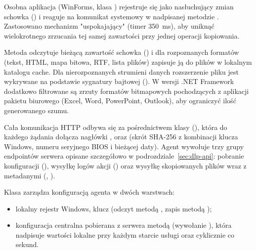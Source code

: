 
Osobna aplikacja  (WinForms, klasa
) rejestruje się jako nasłuchujący zmian schowka
() i reaguje na komunikat systemowy 
w nadpisanej metodzie . Zastosowano mechanizm "uspokajający" (timer 350~ms), aby
uniknąć wielokrotnego zrzucania tej samej zawartości przy jednej operacji kopiowania.

Metoda  odczytuje bieżącą zawartość schowka
() i dla rozpoznanych formatów (tekst, HTML, mapa bitowa, RTF,
lista plików) zapisuje ją do plików w lokalnym katalogu cache. Dla nierozpoznanych strumieni danych
rozszerzenie pliku jest wykrywane na podstawie sygnatury bajtowej ().
W wersji .NET Framework dodatkowo filtrowane są zrzuty formatów bitmapowych pochodzących z aplikacji
pakietu biurowego (Excel, Word, PowerPoint, Outlook), aby ograniczyć ilość generowanego szumu.


Cała komunikacja HTTP odbywa się za pośrednictwem klasy 
(), która do każdego żądania dołącza nagłówki ,
 oraz  (skrót SHA-256 z kombinacji klucza Windows, numeru seryjnego
BIOS i bieżącej daty). Agent wywołuje trzy grupy endpointów serwera opisane szczegółowo w
podrozdziale~\ref{sec:dlp-api}: pobranie konfiguracji (), wysyłkę logów akcji
() oraz wysyłkę skopiowanych plików wraz z metadanymi
(, ).


Klasa  zarządza konfiguracją agenta w dwóch warstwach:

\begin{itemize}[leftmargin=1.6em]
  \item lokalny rejestr Windows, klucz 
        (odczyt metodą , zapis metodą );
  \item konfiguracja centralna pobierana z serwera metodą  (wywołanie
        ), która nadpisuje wartości lokalne przy każdym starcie usługi oraz
        cyklicznie co  sekund.
\end{itemize}

